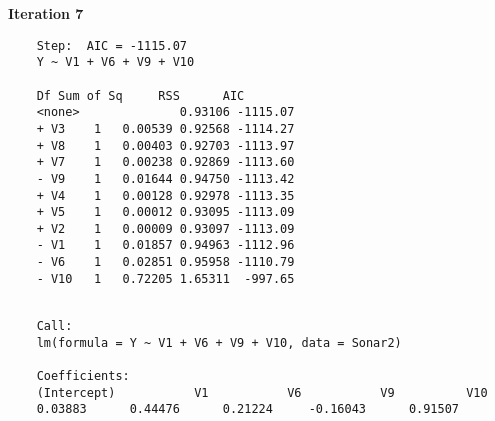 \documentclass[a4paper,12pt]{article}
\begin{document}
\noindent \textbf{Iteration 7}
\begin{framed}
	\begin{verbatim}
	Step:  AIC = -1115.07
	Y ~ V1 + V6 + V9 + V10
	
	Df Sum of Sq     RSS      AIC
	<none>              0.93106 -1115.07
	+ V3    1   0.00539 0.92568 -1114.27
	+ V8    1   0.00403 0.92703 -1113.97
	+ V7    1   0.00238 0.92869 -1113.60
	- V9    1   0.01644 0.94750 -1113.42
	+ V4    1   0.00128 0.92978 -1113.35
	+ V5    1   0.00012 0.93095 -1113.09
	+ V2    1   0.00009 0.93097 -1113.09
	- V1    1   0.01857 0.94963 -1112.96
	- V6    1   0.02851 0.95958 -1110.79
	- V10   1   0.72205 1.65311  -997.65
	
	\end{verbatim}
\end{framed}
\newpage
\begin{framed}
	\begin{verbatim}
	Call:
	lm(formula = Y ~ V1 + V6 + V9 + V10, data = Sonar2)
	
	Coefficients:
	(Intercept)           V1           V6           V9          V10  
	0.03883      0.44476      0.21224     -0.16043      0.91507  
	\end{verbatim}
\end{framed}


%
%
%
\end{document}
